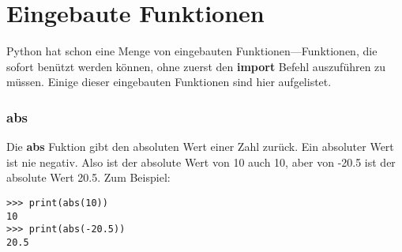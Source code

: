 

\chapter{Eingebaute Funktionen}\label{app:builtinfunctions}

Python hat schon eine Menge von eingebauten Funktionen---Funktionen, die sofort benützt werden können, ohne zuerst den \textbf{import} Befehl auszuführen zu müssen. Einige dieser eingebauten Funktionen sind hier aufgelistet.

\subsection*{abs}

Die \textbf{abs} Fuktion gibt den absoluten Wert einer Zahl zurück. Ein absoluter Wert ist nie negativ. Also ist der absolute Wert von 10 auch 10, aber von -20.5 ist der absolute Wert 20.5. Zum Beispiel:

\begin{Verbatim}[frame=single]
>>> print(abs(10))
10
>>> print(abs(-20.5))
20.5
\end{Verbatim}

